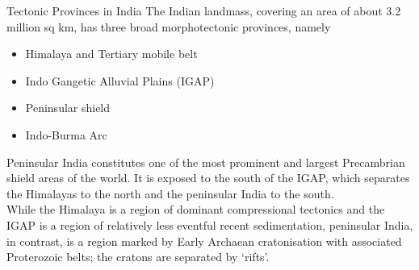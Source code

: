 \documentclass[smaller]{beamer}
\begin{document}
\begin{frame}{Tectonic Provinces in India}
  The Indian landmass, covering an area of about 3.2 million sq km, has three broad morphotectonic provinces, namely
  \begin{itemize}
  \item Himalaya and Tertiary mobile belt
  \item Indo Gangetic Alluvial Plains
(IGAP)
  \item Peninsular shield
  \item Indo-Burma Arc
  \end{itemize}
  Peninsular India constitutes one of the most prominent
and largest Precambrian shield areas of the world. It is
exposed to the south of the IGAP, which separates the Himalayas
to the north and the peninsular India to the south.\\ While
the Himalaya is a region of dominant compressional
tectonics and the IGAP is a region of relatively less eventful
recent sedimentation, peninsular India, in contrast, is a
region marked by Early Archaean cratonisation with
associated Proterozoic belts; the cratons are separated by
‘rifts’.
\end{frame}
\end{document}
